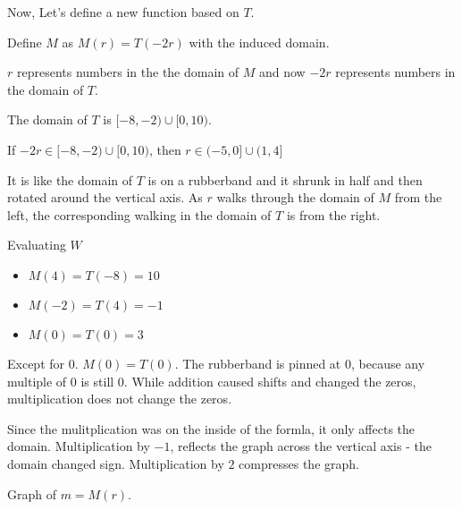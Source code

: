 \documentclass{ximera}
\begin{document}
Now, Let's define a new function based on $T$.



Define $M$ as $M(r) = T(-2r)$ with the induced domain.



$r$ represents numbers in the the domain of $M$ and now $-2r$ represents numbers in the domain of $T$.  

The domain of $T$ is $[-8,-2) \cup [0,10)$.


If $-2r \in [-8,-2) \cup [0,10)$, then $r \in (-5,0] \cup (1, 4]$

It is like the domain of $T$ is on a rubberband and it shrunk in half and then rotated around the vertical axis.  As $r$ walks through the domain of $M$ from the left, the corresponding walking in the domain of $T$ is from the right.



\begin{example}  Evaluating $W$

\begin{itemize}
\item $M(4) = T(-8) = 10$
\item $M(-2) = T(4) = -1$
\item $M(0) = T(0) = 3$
\end{itemize}


\end{example}


Except for $0$. $M(0) = T(0)$.  The rubberband is pinned at $0$, because any multiple of $0$ is still $0$.  While addition caused shifts and changed the zeros, multiplication does not change the zeros.









Since the mulitplication was on the inside of the formla, it only affects the domain.  Multiplication by $-1$, reflects the graph across the vertical axis - the domain changed sign. Multiplication by $2$ compresses the graph.



Graph of $m = M(r)$.
\end{document}
